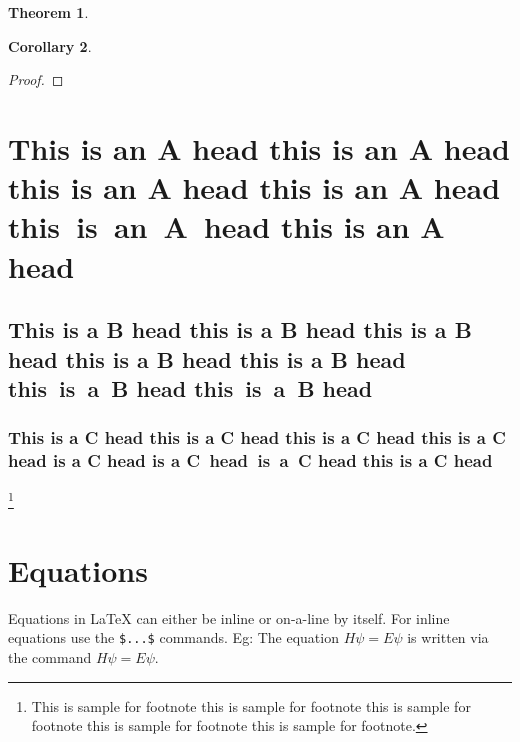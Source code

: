 \documentclass{CUP-JNL-NMJ}%
\theoremstyle{cupplain}
\newtheorem{theorem}{Theorem}[section]
\newtheorem{corollary}[theorem]{Corollary}
\theoremstyle{cupremark}
\theoremstyle{cupdefinition}
\theoremstyle{cupproof}
\newtheorem*{proof}{Proof}
\numberwithin{equation}{section}
\begin{document}
\lipsum[10]

\begin{theorem}\label{theorem1}\lipsum[11]\end{theorem}

\lipsum[12]

\begin{corollary}\label{corollary1}\lipsum[13]\end{corollary}

\begin{proof}\lipsum[14]\end{proof}

\section[This is an A Head]{This is an A head this is an A head this is an A head this is an A head  this~is~an~A~head this is an A head}
\lipsum[15]

\subsection{This is a B head this is a B head this is a B head this is a B head this is a B head this~is~a~B head this~is~a~B head}
\lipsum[16]

\subsubsection{This is a C head this is a C head this is a C head this is a C head is a C head is a C~head~is~a~C head this is a C head}
\lipsum[2]\footnote{This is sample for footnote this is sample for footnote this is sample for footnote  this is sample for footnote this is sample for footnote.}

\section{Equations}

Equations in \LaTeX{} can either be inline or on-a-line by itself. For
inline equations use the \verb+$...$+ commands. Eg: The equation
$H\psi = E \psi$ is written via the command $H \psi = E \psi$.
\end{document}
